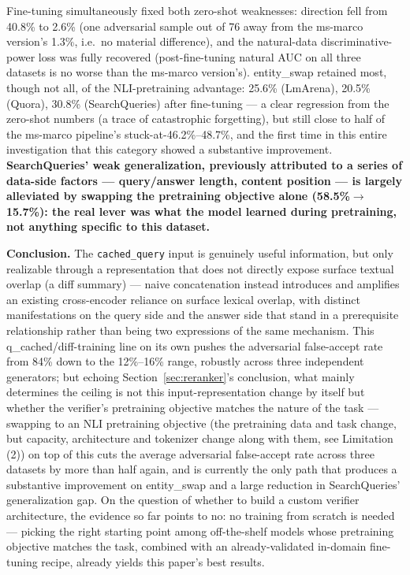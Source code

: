 \documentclass[11pt]{article}
\begin{document}
Fine-tuning simultaneously fixed both zero-shot weaknesses: direction fell from 40.8\% to 2.6\% (one adversarial sample out of 76 away from the ms-marco version's 1.3\%, i.e.\ no material difference), and the natural-data discriminative-power loss was fully recovered (post-fine-tuning natural AUC on all three datasets is no worse than the ms-marco version's). entity\_swap retained most, though not all, of the NLI-pretraining advantage: 25.6\% (LmArena), 20.5\% (Quora), 30.8\% (SearchQueries) after fine-tuning --- a clear regression from the zero-shot numbers (a trace of catastrophic forgetting), but still close to half of the ms-marco pipeline's stuck-at-46.2\%--48.7\%, and the first time in this entire investigation that this category showed a substantive improvement. \textbf{SearchQueries' weak generalization, previously attributed to a series of data-side factors --- query/answer length, content position --- is largely alleviated by swapping the pretraining objective alone (58.5\%$\to$15.7\%): the real lever was what the model learned during pretraining, not anything specific to this dataset.}

\textbf{Conclusion.} The \texttt{cached\_\allowbreak{}query} input is genuinely useful information, but only realizable through a representation that does not directly expose surface textual overlap (a diff summary) --- naive concatenation instead introduces and amplifies an existing cross-encoder reliance on surface lexical overlap, with distinct manifestations on the query side and the answer side that stand in a prerequisite relationship rather than being two expressions of the same mechanism. This q\_cached/diff-training line on its own pushes the adversarial false-accept rate from 84\% down to the 12\%--16\% range, robustly across three independent generators; but echoing Section~\ref{sec:reranker}'s conclusion, what mainly determines the ceiling is not this input-representation change by itself but whether the verifier's pretraining objective matches the nature of the task --- swapping to an NLI pretraining objective (the pretraining data and task change, but capacity, architecture and tokenizer change along with them, see Limitation (2)) on top of this cuts the average adversarial false-accept rate across three datasets by more than half again, and is currently the only path that produces a substantive improvement on entity\_swap and a large reduction in SearchQueries' generalization gap. On the question of whether to build a custom verifier architecture, the evidence so far points to no: no training from scratch is needed --- picking the right starting point among off-the-shelf models whose pretraining objective matches the task, combined with an already-validated in-domain fine-tuning recipe, already yields this paper's best results.
\end{document}
